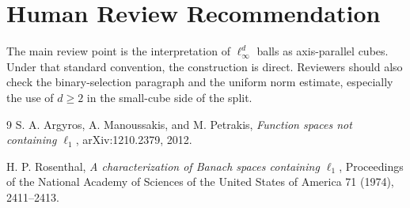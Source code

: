 \documentclass[11pt]{article}
\begin{document}
\section{Human Review Recommendation}

The main review point is the interpretation of $\ell_\infty^d$ balls as
axis-parallel cubes.  Under that standard convention, the construction is
direct.  Reviewers should also check the binary-selection paragraph and the
uniform norm estimate, especially the use of $d\ge2$ in the small-cube side of
the split.

\begin{thebibliography}{9}
S. A. Argyros, A. Manoussakis, and M. Petrakis,
\emph{Function spaces not containing $\ell_1$},
arXiv:1210.2379, 2012.

H. P. Rosenthal,
\emph{A characterization of Banach spaces containing $\ell_1$},
Proceedings of the National Academy of Sciences of the United States of America
71 (1974), 2411--2413.
\end{thebibliography}
\end{document}
